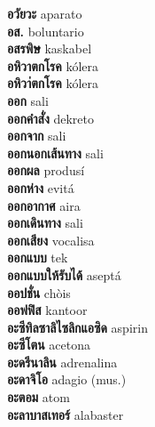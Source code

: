 \textbf{ อวัยวะ  } aparato \\
\textbf{ อส.  } boluntario \\
\textbf{ อสรพิษ  } kaskabel \\
\textbf{ อหิวาตกโรค  } kólera \\
\textbf{ อหิวา่ตกโรค  } kólera \\
\textbf{ ออก  } sali \\
\textbf{ ออกคำสั่ง  } dekreto \\
\textbf{ ออกจาก  } sali \\
\textbf{ ออกนอกเส้นทาง  } sali \\
\textbf{ ออกผล  } produsí \\
\textbf{ ออกห่าง  } evitá \\
\textbf{ ออกอากาศ  } aira \\
\textbf{ ออกเดินทาง  } sali \\
\textbf{ ออกเสียง  } vocalisa \\
\textbf{ ออกแบบ  } tek \\
\textbf{ ออกแบบให้รับได้  } aseptá \\
\textbf{ ออปชั่น  } chòis \\
\textbf{ ออฟฟิส  } kantoor \\
\textbf{ อะซีทิลซาลิไซลิกแอซิด  } aspirin \\
\textbf{ อะซีโตน  } acetona \\
\textbf{ อะดรีนาลิน  } adrenalina \\
\textbf{ อะดาจิโอ  } adagio (mus.) \\
\textbf{ อะตอม  } atom \\
\textbf{ อะลาบาสเทอร์  } alabaster \\
